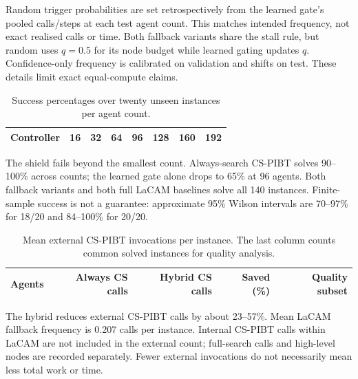 \documentclass[10pt,a4paper]{article}
\begin{document}
Random trigger probabilities are set retrospectively from the learned gate's pooled calls/steps at each test agent count. This matches intended frequency, not exact realised calls or time. Both fallback variants share the stall rule, but random uses $q=0.5$ for its node budget while learned gating updates $q$. Confidence-only frequency is calibrated on validation and shifts on test. These details limit exact equal-compute claims.

\begin{table}[H]\centering\small\setlength{\tabcolsep}{5pt}
\begin{tabular}{@{}lrrrrrrr@{}}\toprule
Controller & 16 & 32 & 64 & 96 & 128 & 160 & 192\\\midrule
\end{tabular}
\caption{Success percentages over twenty unseen instances per agent count.}
\end{table}
The shield fails beyond the smallest count. Always-search CS-PIBT solves 90--100\% across counts; the learned gate alone drops to 65\% at 96 agents. Both fallback variants and both full LaCAM baselines solve all 140 instances. Finite-sample success is not a guarantee: approximate 95\% Wilson intervals are 70--97\% for 18/20 and 84--100\% for 20/20.

\begin{table}[H]\centering\small
\begin{tabular}{@{}rrrrr@{}}\toprule
Agents & Always CS calls & Hybrid CS calls & Saved (\%) & Quality subset\\\midrule
\end{tabular}
\caption{Mean external CS-PIBT invocations per instance. The last column counts common solved instances for quality analysis.}
\end{table}
The hybrid reduces external CS-PIBT calls by about 23--57\%. Mean LaCAM fallback frequency is 0.207 calls per instance. Internal CS-PIBT calls within LaCAM are not included in the external count; full-search calls and high-level nodes are recorded separately. Fewer external invocations do not necessarily mean less total work or time.

\newpage
\end{document}
